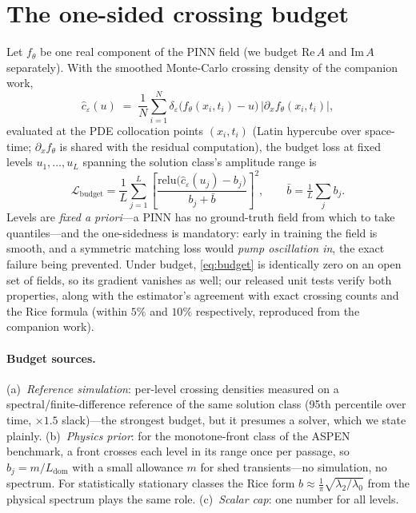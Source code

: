 \documentclass[10pt]{article}
\newcommand{\loss}{\mathcal{L}}
\begin{document}
\section{The one-sided crossing budget}
\label{sec:method}

Let $f_\theta$ be one real component of the PINN field (we budget $\mathrm{Re}\,A$
and $\mathrm{Im}\,A$ separately). With the smoothed Monte-Carlo crossing density of
the companion work,
\begin{equation}
\hat c_\varepsilon(u) \;=\; \frac{1}{N}\sum_{i=1}^{N}
\delta_\varepsilon\!\bigl(f_\theta(x_i,t_i)-u\bigr)\,
\bigl|\partial_x f_\theta(x_i,t_i)\bigr|,
\label{eq:estimator}
\end{equation}
evaluated at the PDE collocation points $(x_i,t_i)$ (Latin hypercube over
space-time; $\partial_x f_\theta$ is shared with the residual computation), the
budget loss at fixed levels $u_1,\dots,u_L$ spanning the solution class's amplitude
range is
\begin{equation}
\loss_{\mathrm{budget}}
= \frac1L \sum_{j=1}^{L}
\left[\frac{\mathrm{relu}\bigl(\hat c_\varepsilon(u_j) - b_j\bigr)}
{b_j + \bar b}\right]^2 ,
\qquad \bar b = \tfrac1L\textstyle\sum_j b_j .
\label{eq:budget}
\end{equation}
Levels are \emph{fixed a priori}---a PINN has no ground-truth field from which to
take quantiles---and the one-sidedness is mandatory: early in training the field is
smooth, and a symmetric matching loss would \emph{pump oscillation in}, the exact
failure being prevented. Under budget, \eqref{eq:budget} is identically zero on an
open set of fields, so its gradient vanishes as well; our released unit tests verify
both properties, along with the estimator's agreement with exact crossing counts and
the Rice formula (within $5\%$ and $10\%$ respectively, reproduced from the
companion work).

\paragraph{Budget sources.} (a)~\emph{Reference simulation}: per-level crossing
densities measured on a spectral/finite-difference reference of the same solution
class (95th percentile over time, $\times1.5$ slack)---the strongest budget, but it
presumes a solver, which we state plainly. (b)~\emph{Physics prior}: for the
monotone-front class of the ASPEN benchmark, a front crosses each level in its range
once per passage, so $b_j = m/L_{\mathrm{dom}}$ with a small allowance $m$ for shed
transients---no simulation, no spectrum. For statistically stationary classes the
Rice form $b \approx \tfrac1\pi\sqrt{\lambda_2/\lambda_0}$ from the physical
spectrum plays the same role. (c)~\emph{Scalar cap}: one number for all levels.
\end{document}
